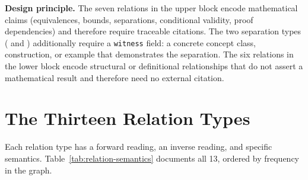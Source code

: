 \noindent\textbf{Design principle.}  The seven relations in the upper block encode mathematical claims (equivalences, bounds, separations, conditional validity, proof dependencies) and therefore require traceable citations.  The two separation types ( and ) additionally require a \texttt{witness} field: a concrete concept class, construction, or example that demonstrates the separation.  The six relations in the lower block encode structural or definitional relationships that do not assert a mathematical result and therefore need no external citation.

\section{The Thirteen Relation Types}
\label{sec:relation-semantics}

Each relation type has a forward reading, an inverse reading, and specific semantics.  Table~\ref{tab:relation-semantics} documents all 13, ordered by frequency in the graph.

